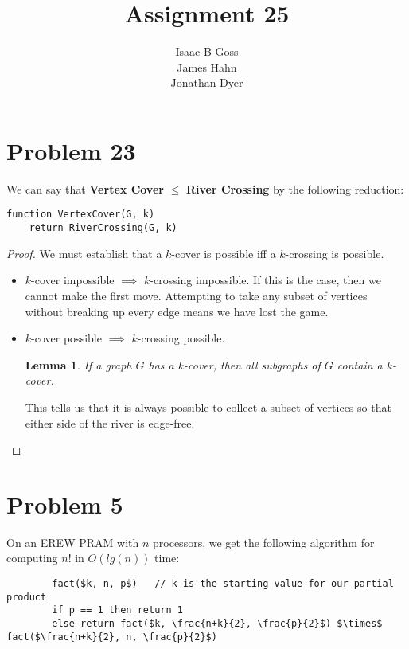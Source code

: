 \documentclass{article}
\author{Isaac B Goss\\ James Hahn\\ Jonathan Dyer}
\title{Assignment 25}
\newtheorem{lemma}{Lemma}
\providecommand{\prob}[1]{\section*{Problem #1}}
\providecommand{\reducible}[2]{
  \textbf{#1} $\leq$ \textbf{#2}
}
\begin{document}
\maketitle

    \prob{23}
    We can say that \reducible{Vertex Cover}{River Crossing} by the following reduction:
    \begin{lstlisting}
function VertexCover(G, k)
    return RiverCrossing(G, k)
    \end{lstlisting}
    \begin{proof}
        We must establish that a $k$-cover is possible iff a $k$-crossing is possible.
        \begin{itemize}
            \item $k$-cover impossible $\implies$ $k$-crossing impossible.
            If this is the case, then we cannot make the first move.
            Attempting to take any subset of vertices without breaking up every edge means we have lost the game.
            
            \item $k$-cover possible $\implies$ $k$-crossing possible.
            \begin{lemma}
                If a graph $G$ has a $k$-cover, then all subgraphs of $G$ contain a $k$-cover.
            \end{lemma}
            
            This tells us that it is always possible to collect a subset of vertices so that either side of the river is edge-free.
            
        \end{itemize}
    \end{proof}
    
    \prob{5}
    On an EREW PRAM with $n$ processors, we get the following algorithm for computing $n!$ in $O(lg(n))$ time:\\
    \begin{lstlisting}
        fact($k, n, p$)   // k is the starting value for our partial product
        if p == 1 then return 1
        else return fact($k, \frac{n+k}{2}, \frac{p}{2}$) $\times$ fact($\frac{n+k}{2}, n, \frac{p}{2}$)
    \end{lstlisting}
    
\end{document}
